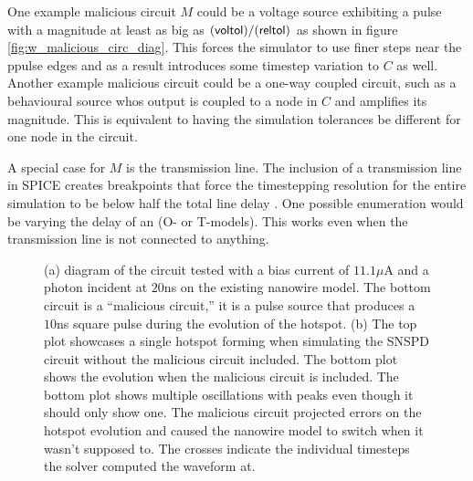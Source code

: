 One example malicious circuit $M$ could be a voltage source exhibiting a pulse 
with a magnitude at least as big as $(\textsf{voltol})/(\textsf{reltol})$
as shown in figure \ref{fig:w_malicious_circ_diag}.
This forces the simulator to use finer steps near the ppulse edges and as a result
introduces some timestep variation to $C$ as well. Another example malicious circuit 
could be a one-way coupled circuit, such as a behavioural source whos output is coupled
to a node in $C$ and amplifies its magnitude. This is equivalent to having the simulation
tolerances be different for one node in the circuit.

A special case for $M$ is the transmission line. The inclusion of a transmission line
in SPICE creates breakpoints that force the timestepping resolution for the entire simulation
to be below half the total line delay \cite{hspice, spice-book}. One possible enumeration would
be varying the delay of an  (O- or T-models). This works even when the transmission line
is not connected to anything.

\begin{figure}
    \centering
    \caption{(a) diagram of the circuit tested with a bias current of $11.1\mu$A and a photon incident at $20$ns on the existing nanowire model. The bottom circuit is a ``malicious circuit,'' it is a pulse source that produces a $10$ns square pulse during the evolution of the hotspot. (b) The top plot showcases a single hotspot forming when simulating
    the SNSPD circuit without the malicious circuit included. The bottom plot shows the evolution when the malicious circuit
    is included. The bottom plot shows multiple oscillations with peaks even though it should only show one. The
    malicious circuit projected errors on the hotspot evolution and caused the nanowire model to switch when it wasn't supposed to. The crosses indicate the individual timesteps the solver computed the waveform at.}
\end{figure}

